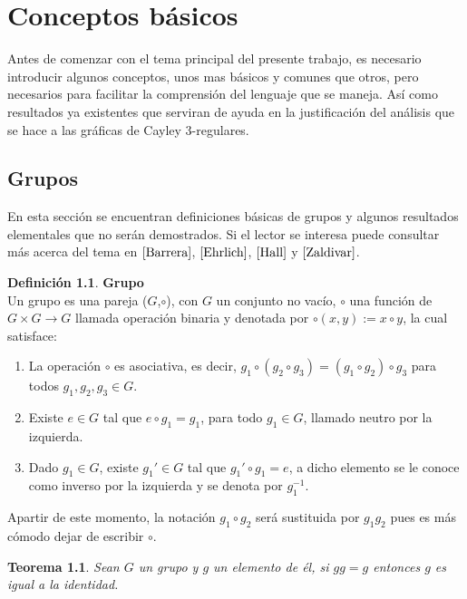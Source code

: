 \documentclass[12pt]{book}
\newtheorem{theorem}{Teorema}
\theoremstyle{definition}
\newtheorem{definition}{Definición}
\begin{document}
\chapter{Conceptos básicos}

Antes de comenzar con el tema principal del presente trabajo, es
necesario introducir algunos conceptos, unos mas básicos y comunes
que otros, pero necesarios para facilitar la comprensión del
lenguaje que se maneja. Así como resultados ya existentes que
serviran de ayuda en la justificación del análisis que se hace a las
gráficas de Cayley 3-regulares.


\section{Grupos}

En esta sección se encuentran definiciones básicas de grupos y
algunos resultados elementales que no serán demostrados. Si
el lector se interesa puede consultar más acerca del tema en
$\cite{Barrera}$, $\cite{Ehrlich}$, $\cite{Hall}$ y $\cite{Zaldivar}$.

\begin{definition}{\textbf{Grupo}}\\ Un grupo es una
pareja ($G$,$\circ$), con $G$ un conjunto no vacío, $\circ$ una
función de $G\times G \rightarrow G$ llamada operación binaria y
denotada por $\circ (x,y):=x\circ y$, la cual satisface:

\begin{enumerate}
\item La operación $\circ$ es asociativa, es decir, $g_1\circ
  (g_2\circ g_3)=(g_1 \circ g_2)\circ g_3$ para todos
  $g_1,g_2,g_3\in G$.
\item Existe $e\in G$ tal que $e\circ g_1=g_1$, para todo
  $g_1\in G$, llamado neutro por la izquierda.
\item Dado $g_1\in G$, existe $g_1'\in G$ tal que $g_1'\circ g_1
  = e$, a dicho elemento se le conoce como inverso por la
  izquierda y se denota por $g_1^{-1}$.
\end{enumerate}
\end{definition}


Apartir de este momento, la notación $g_1\circ g_2$ ser\'a
sustituida por $g_1g_2$ pues es m\'as cómodo dejar de escribir
$\circ$. 



\begin{theorem}\label{gg=g}
  Sean $G$ un grupo y $g$ un elemento de él, si $gg=g$ entonces $g$ es
  igual a la identidad.
\end{theorem}
\end{document}
